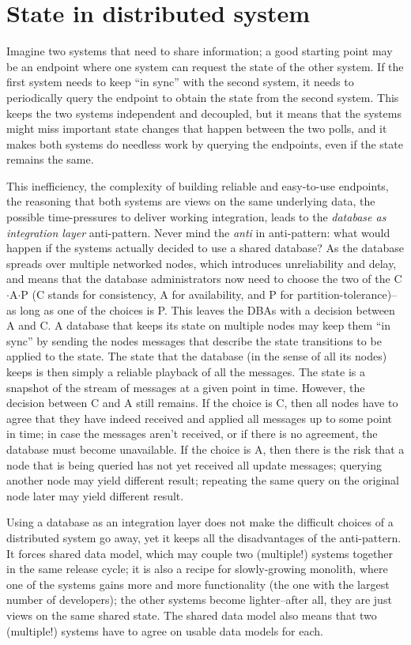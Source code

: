 \documentclass[10 pt, twocolumn]{article}
\begin{document}
\section{State in distributed system}
Imagine two systems that need to share information; a good starting point may be an endpoint where one system can request the state of the other system. If the first system needs to keep ``in sync'' with the second system, it needs to periodically query the endpoint to obtain the state from the second system. This keeps the two systems independent and decoupled, but it means that the systems might miss important state changes that happen between the two polls, and it makes both systems do needless work by querying the endpoints, even if the state remains the same.

This inefficiency, the complexity of building reliable and easy-to-use endpoints, the reasoning that both systems are views on the same underlying data, the possible time-pressures to deliver working integration, leads to the \emph{database as integration layer} anti-pattern\cite{eip}. Never mind the \emph{anti} in anti-pattern: what would happen if the systems actually decided to use a shared database? As the database spreads over multiple networked nodes, which introduces unreliability and delay, and means that the database administrators now need to choose the two of the C$\cdot$A$\cdot$P (C stands for consistency, A for availability, and P for partition-tolerance)--as long as one of the choices is P. This leaves the DBAs with a decision between A and C. A database that keeps its state on multiple nodes may keep them ``in sync'' by sending the nodes messages that describe the state transitions to be applied to the state. The state that the database (in the sense of all its nodes) keeps is then simply a reliable playback of all the messages. The state is a snapshot of the stream of messages at a given point in time. However, the decision between C and A still remains. If the choice is C, then all nodes have to agree that they have indeed received and applied all messages up to some point in time; in case the messages aren't received, or if there is no agreement, the database must become unavailable. If the choice is A, then there is the risk that a node that is being queried has not yet received all update messages; querying another node may yield different result; repeating the same query on the original node later may yield different result.

Using a database as an integration layer does not make the difficult choices of a distributed system go away, yet it keeps all the disadvantages of the anti-pattern. It forces shared data model, which may couple two (multiple!) systems together in the same release cycle; it is also a recipe for slowly-growing monolith, where one of the systems gains more and more functionality (the one with the largest number of developers); the other systems become lighter--after all, they are just views on the same shared state. The shared data model also means that two (multiple!) systems have to agree on usable data models for each.
\end{document}
